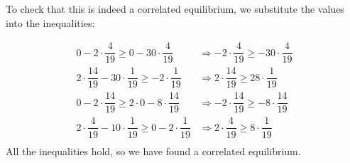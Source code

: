 \documentclass[11pt,journal]{article}
\begin{document}
	To check that this is indeed a correlated equilibrium, we substitute the values into the inequalities:
	
	\begin{align*}
		0 - 2\cdot \dfrac{4}{19} \geq 0 - 30 \cdot \dfrac{4}{19}  &\Longrightarrow -2 \cdot \dfrac{4}{19} \geq -30 \cdot \dfrac{4}{19}  \\
		2\cdot \dfrac{14}{19} -30 \cdot \dfrac{1}{19} \geq -2 \cdot \dfrac{1}{19} & \Longrightarrow 2 \cdot \dfrac{14}{19} \geq 28 \cdot \dfrac{1}{19}  \\
		0 - 2 \cdot \dfrac{14}{19}  \geq 2 \cdot 0 - 8 \cdot \dfrac{14}{19} &  \Longrightarrow -2 \cdot \dfrac{14}{19} \geq -8 \cdot \dfrac{14}{19} \\
		2 \cdot \dfrac{4}{19} -10 \cdot \dfrac{1}{19} \geq 0 - 2 \cdot \dfrac{1}{19} & \Longrightarrow 2 \cdot \dfrac{4}{19} \geq 8 \cdot \dfrac{1}{19}  \\
	\end{align*}
	All the inequalities hold, so we have found a correlated equilibrium. 
	

	
\end{document}
